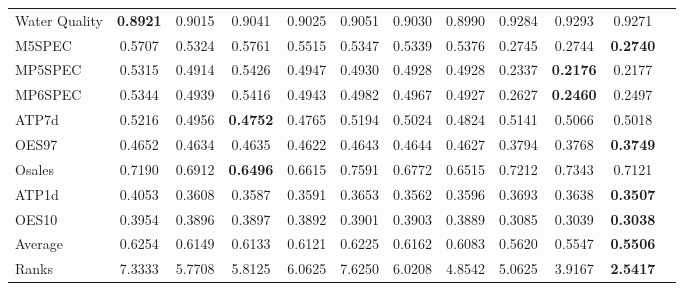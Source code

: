 \documentclass[preprint,12pt]{elsarticle}
\begin{document}
{\begin{table*}[th!]
\begin{threeparttable}
{\begin{tabular}{lccccccccccc}
Water Quality &\textbf{0.8921} &0.9015 &0.9041 &0.9025 &0.9051 &0.9030 &0.8990 &0.9284 &0.9293 &0.9271 &  \\
M5SPEC &0.5707 &0.5324 &0.5761 &0.5515 &0.5347 &0.5339 &0.5376 &0.2745 &0.2744 &\textbf{0.2740} &  \\
MP5SPEC &0.5315 &0.4914 &0.5426 &0.4947 &0.4930 &0.4928 &0.4928 &0.2337 &\textbf{0.2176} &0.2177 &  \\
MP6SPEC &0.5344 &0.4939 &0.5416 &0.4943 &0.4982 &0.4967 &0.4927 &0.2627 &\textbf{0.2460} &0.2497 &  \\
ATP7d &0.5216 &0.4956 &\textbf{0.4752} &0.4765 &0.5194 &0.5024 &0.4824 &0.5141 &0.5066 &0.5018 &  \\
OES97 &0.4652 &0.4634 &0.4635 &0.4622 &0.4643 &0.4644 &0.4627 &0.3794 &0.3768 &\textbf{0.3749} &  \\
Osales &0.7190 &0.6912 &\textbf{0.6496} &0.6615 &0.7591 &0.6772 &0.6515 &0.7212 &0.7343 &0.7121 &  \\
ATP1d &0.4053 &0.3608 &0.3587 &0.3591 &0.3653 &0.3562 &0.3596 &0.3693 &0.3638 &\textbf{0.3507} &  \\
OES10 &0.3954 &0.3896 &0.3897 &0.3892 &0.3901 &0.3903 &0.3889 &0.3085 &0.3039 &\textbf{0.3038} &  \\
\hline
Average &0.6254 &0.6149 &0.6133 &0.6121 &0.6225 &0.6162 &0.6083 &0.5620 &0.5547 &\textbf{0.5506} &  \\
Ranks &7.3333 &5.7708 &5.8125 &6.0625 &7.6250 &6.0208 &4.8542 &5.0625 &3.9167 &\textbf{2.5417} &  \\
\bottomrule
\end{tabular}}
\end{threeparttable}
\label{tab:armseresults}
\end{table*}
\vspace{-1.7em}
\begin{figure}[h!]
\centering
\small
{}
\end{figure}}
\end{document}
